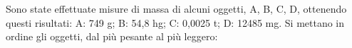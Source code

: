Sono state effettuate misure di massa di alcuni 
oggetti, A, B, C, D, ottenendo questi risultati: 
A: 749 g;
B: 54,8 hg;
C: 0,0025 t;
D: 12485 mg.
Si mettano in ordine gli oggetti, dal più pesante al più leggero:
